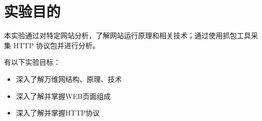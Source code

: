 \section{实验目的}
本实验通过对特定网站分析，了解网站运行原理和相关技术；通过使用抓包工具采集
HTTP 协议包并进行分析。

有以下实验目标：
\begin{itemize}
    \item 深入了解万维网结构、原理、技术
    \item 深入了解并掌握WEB页面组成
    \item 深入了解并掌握HTTP协议
\end{itemize}